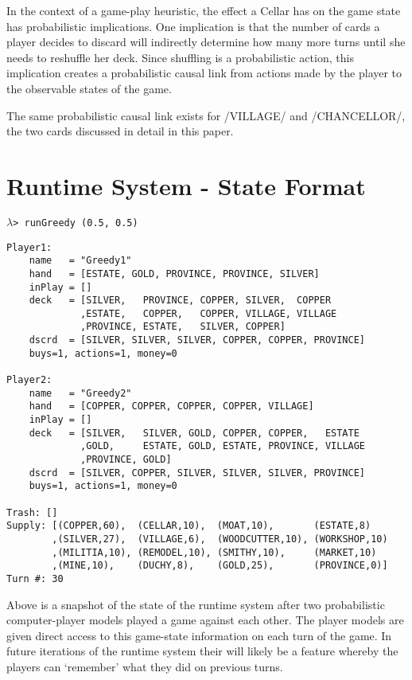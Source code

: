 In the context of a game-play heuristic, the effect a Cellar has on the game state
has probabilistic implications. One implication is that the number of cards a
player decides to discard will indirectly determine how many more turns until
she needs to reshuffle her deck. Since shuffling is a probabilistic action, this
implication creates a probabilistic causal link from actions made by the player
to the observable states of the game.

The same probabilistic causal link exists for \hsk/VILLAGE/ and \hsk/CHANCELLOR/,
the two cards discussed in detail in this paper.

\section{Runtime System - State Format}
\begin{small}
$\lambda$\verb|> runGreedy (0.5, 0.5)|
\end{small}
\begin{Verbatim}[fontsize=\small]
Player1:
    name   = "Greedy1"
    hand   = [ESTATE, GOLD, PROVINCE, PROVINCE, SILVER]
    inPlay = []
    deck   = [SILVER,   PROVINCE, COPPER, SILVER,  COPPER
             ,ESTATE,   COPPER,   COPPER, VILLAGE, VILLAGE
             ,PROVINCE, ESTATE,   SILVER, COPPER]
    dscrd  = [SILVER, SILVER, SILVER, COPPER, COPPER, PROVINCE]
    buys=1, actions=1, money=0

Player2:
    name   = "Greedy2"
    hand   = [COPPER, COPPER, COPPER, COPPER, VILLAGE]
    inPlay = []
    deck   = [SILVER,   SILVER, GOLD, COPPER, COPPER,   ESTATE
             ,GOLD,     ESTATE, GOLD, ESTATE, PROVINCE, VILLAGE
             ,PROVINCE, GOLD]
    dscrd  = [SILVER, COPPER, SILVER, SILVER, SILVER, PROVINCE]
    buys=1, actions=1, money=0

Trash: []
Supply: [(COPPER,60),  (CELLAR,10),  (MOAT,10),       (ESTATE,8)
        ,(SILVER,27),  (VILLAGE,6),  (WOODCUTTER,10), (WORKSHOP,10)
        ,(MILITIA,10), (REMODEL,10), (SMITHY,10),     (MARKET,10)
        ,(MINE,10),    (DUCHY,8),    (GOLD,25),       (PROVINCE,0)]
Turn #: 30
\end{Verbatim}

Above is a snapshot of the state of the runtime system after two
probabilistic computer-player models played a game against each other.
The player models are given direct access to this game-state information
on each turn of the game. In future iterations of the runtime system
their will likely be a feature whereby the players can `remember' what
they did on previous turns.


